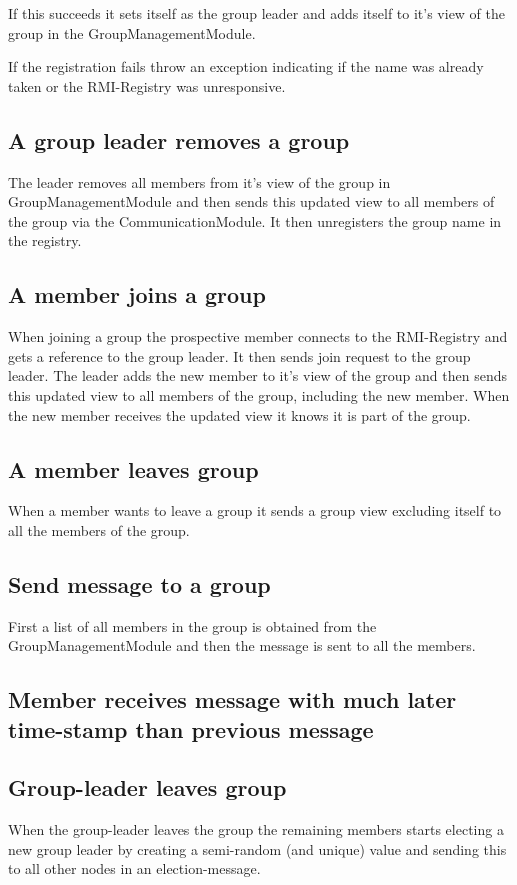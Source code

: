 \documentclass[11pt,swedish]{article}
\begin{document}
If this succeeds it sets itself as the group leader and adds itself to it's view of the group in the GroupManagementModule.

If the registration fails throw an exception indicating if the name was already taken or the RMI-Registry was unresponsive.

\subsection{A group leader removes a group}
The leader removes all members from it's view of the group in GroupManagementModule and then sends this updated view to all members of the group via the CommunicationModule. It then unregisters the group name in the registry.

\subsection{A member joins a group}
When joining a group the prospective member connects to the RMI-Registry and gets a reference to the group leader. It then sends join request to the group leader. The leader adds the new member to it's view of the group and then sends this updated view to all members of the group, including the new member. When the new member receives the updated view it knows it is part of the group.

\subsection{A member leaves group}
When a member wants to leave a group it sends a group view excluding itself to all the members of the group.

\subsection{Send message to a group}
First a list of all members in the group is obtained from the GroupManagementModule and then the message is sent to all the members.

\subsection{Member receives message with much later time-stamp than previous message}

\subsection{Group-leader leaves group}
When the group-leader leaves the group the remaining members starts electing a new group leader by creating a semi-random (and unique) value and sending this to all other nodes in an election-message.
\end{document}

